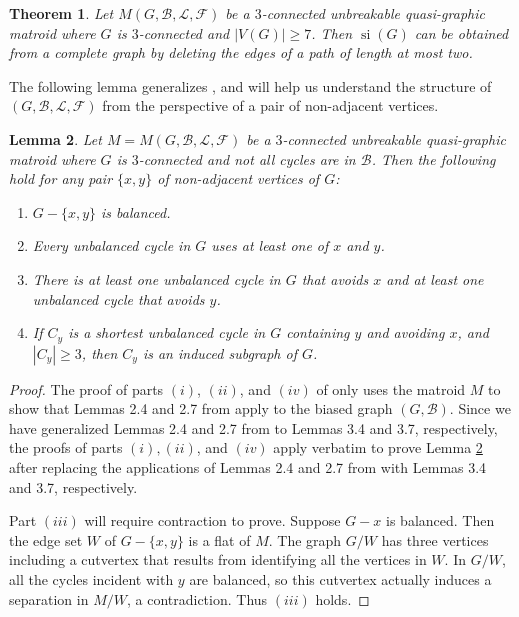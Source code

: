 \documentclass[12pt]{article}
\newtheorem{theorem}{Theorem}[section]
\newtheorem{lemma}[theorem]{Lemma}
\theoremstyle{definition}
\theoremstyle{plain} %
\newcommand{\cB}{\mathcal{B}}
\newcommand{\cF}{\mathcal{F}}
\newcommand{\cL}{\mathcal{L}}
\DeclareMathOperator{\si}{si}
\begin{document}
\begin{theorem} \label{thm: 4.1}
Let $M(G,\cB,\cL,\cF)$ be a $3$-connected unbreakable quasi-graphic matroid where $G$ is $3$-connected and $|V(G)| \ge 7$.
Then $\si(G)$ can be obtained from a complete graph by deleting the edges of a path of length at most two.
\end{theorem}


The following lemma generalizes \cite[Lemma 4.2]{Fife-Mayhew-Oxley-Semple2020}, and will help us understand the structure of $(G, \cB, \cL, \cF)$ from the perspective of a pair of non-adjacent vertices.

\begin{lemma} \label{lem: x,y pair of non-adjacent vertices}
Let $M=M(G,\cB,\cL,\cF)$ be a $3$-connected unbreakable quasi-graphic matroid where $G$ is $3$-connected and not all cycles are in $\cB$.
Then the following hold for any pair $\{x,y\}$ of non-adjacent vertices of $G$:
\begin{enumerate}[$(i)$]
\item $G - \{x,y\}$ is balanced.

\item Every unbalanced cycle in $G$ uses at least one of $x$ and $y$.

\item There is at least one unbalanced cycle in $G$ that avoids $x$ and at least one unbalanced cycle that avoids $y$.

\item If $C_y$ is a shortest unbalanced cycle in $G$ containing $y$ and avoiding $x$, and $|C_y| \ge 3$, then $C_y$ is an induced subgraph of $G$.
\end{enumerate}
\end{lemma}
\begin{proof}
The proof of parts $(i)$, $(ii)$, and $(iv)$ of \cite[Lemma 4.2]{Fife-Mayhew-Oxley-Semple2020} only uses the matroid $M$ to show that Lemmas 2.4 and 2.7 from \cite{Fife-Mayhew-Oxley-Semple2020} apply to the biased graph $(G,\cB)$. Since we have generalized Lemmas 2.4 and 2.7 from \cite{Fife-Mayhew-Oxley-Semple2020} to Lemmas 3.4 and 3.7, respectively, the proofs of parts $(i),(ii)$, and $(iv)$ apply verbatim to prove Lemma \ref{lem: x,y pair of non-adjacent vertices} after replacing the applications of Lemmas 2.4 and 2.7 from \cite{Fife-Mayhew-Oxley-Semple2020} with Lemmas 3.4 and 3.7, respectively.

Part $(iii)$ will require contraction to prove. 
Suppose $G-x$ is balanced. 
Then the edge set $W$ of $G - \{x,y\}$ is a flat of $M$.
The graph $G/W$ has three vertices including a cutvertex that results from identifying all the vertices in $W$. 
In $G/W$, all the cycles incident with $y$ are balanced, so this cutvertex actually induces a separation in $M/W$, a contradiction.
Thus $(iii)$ holds.
\end{proof}
\end{document}
